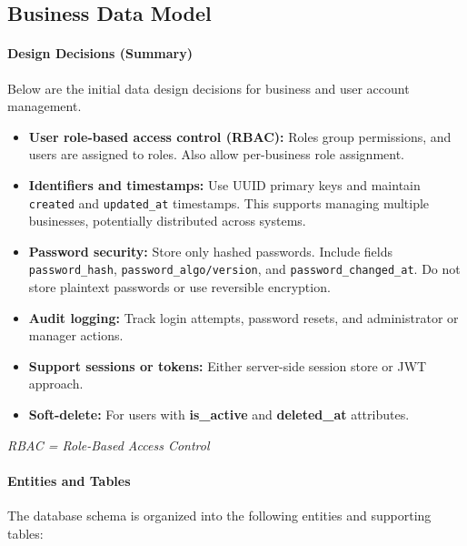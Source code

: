 \documentclass[]{VUMIFTemplateClass}
\begin{document}
\subsection{Business Data Model}

\paragraph{Design Decisions (Summary)}

Below are the initial data design decisions for business and user account management. 
\begin{itemize}
    \item \textbf{User role-based access control (RBAC):} Roles group permissions, and users are assigned to roles. Also allow per-business role assignment.
    \item \textbf{Identifiers and timestamps:} Use UUID primary keys and maintain \texttt{created} and \texttt{updated\_at} timestamps. This supports managing multiple businesses, potentially distributed across systems.
    \item \textbf{Password security:} Store only hashed passwords. Include fields \texttt{password\_hash}, \texttt{password\_algo/version}, and \texttt{password\_changed\_at}. Do not store plaintext passwords or use reversible encryption.
    \item \textbf{Audit logging:} Track login attempts, password resets, and administrator or manager actions.
    \item \textbf{Support sessions or tokens:} Either server-side session store or JWT approach.
    \item \textbf{Soft-delete:} For users with \textbf{is\_active} and \textbf{deleted\_at} attributes.
\end{itemize}
\textit{RBAC = Role-Based Access Control}

\paragraph{Entities and Tables}  

The database schema is organized into the following entities and supporting tables:  
\end{document}

